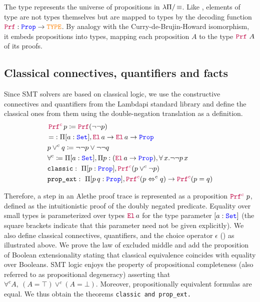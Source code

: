 The type \prop{} represents the universe of propositions in $\lambda\Pi/\mathop{\equiv}$. Like \set{}, elements of type \prop{} are not types themselves but are mapped to types by the decoding function $\textcolor{purple}{\texttt{\upshape{Prf}}}{}: \textcolor{blue}{\texttt{\upshape{Prop}}} \rightarrow \textcolor{orange}{\texttt{\upshape{TYPE}}}$. By analogy with the Curry-de-Brujin-Howard isomorphism, it embeds propositions into types, mapping each proposition $A$ to the type $\textcolor{purple}{\texttt{\upshape{Prf}}}{}~A$ of its proofs.

\subsection{Classical connectives, quantifiers and facts}

Since SMT solvers are based on classical logic, we use the constructive connectives and quantifiers from the Lambdapi standard library and define the classical ones from them using the double-negation translation \cite{dowek:classical} as a definition.
%
\begin{align*}
& \mathop{\textcolor{purple}{\texttt{\upshape{Prf}}^c}} p \coloneqq \mathop{\textcolor{purple}{\texttt{\upshape{Prf}}}{}} (\neg \neg p) \\
& \mathop{=}:  \Pi {[a: \textcolor{blue}{\texttt{\upshape{Set}}}]}, \textcolor{purple}{\texttt{\upshape{El}}}\, a \rightarrow \textcolor{purple}{\texttt{\upshape{El}}}\,a \rightarrow \textcolor{blue}{\texttt{\upshape{Prop}}} \\
& p \lor^c q \coloneqq  \neg \neg p \lor \neg \neg q \\
& \forall^c \coloneqq \Pi {[a: \textcolor{blue}{\texttt{\upshape{Set}}}]},  \Pi p: (\textcolor{purple}{\texttt{\upshape{El}}}\, a \rightarrow \textcolor{blue}{\texttt{\upshape{Prop}}}),  \forall \, x. \neg \neg  p\,x \\
&\texttt{classic}:\  \Pi [p: \textcolor{blue}{\texttt{\upshape{Prop}}}], \textcolor{purple}{\texttt{\upshape{Prf}}^c} (p \lor^c \neg p) \\
&\texttt{prop\_ext}:\  \Pi [p\,q: \textcolor{blue}{\texttt{\upshape{Prop}}}], \textcolor{purple}{\texttt{\upshape{Prf}}^c} (p \Leftrightarrow^c q ) \rightarrow \textcolor{purple}{\texttt{\upshape{Prf}}^c} (p = q) \\
\end{align*}

Therefore, a step in an Alethe proof trace is represented as a proposition $\textcolor{purple}{\texttt{\upshape{Prf}}^c}~p$, defined as the intuitionistic proof \prf{} of the doubly negated predicate.
Equality over small types is parameterized over types
$\textcolor{purple}{\texttt{\upshape{El}}}\,a$ for the type parameter $[a : \textcolor{blue}{\texttt{\upshape{Set}}}{}]$ (the square brackets indicate that this parameter need not be given explicitly).
We also define classical connectives, quantifiers, and the choice operator $\epsilon$ (\cite[\S 2.1]{alethespec}) as illustrated above.
We prove the law of excluded middle and add the proposition of Boolean extensionality stating that classical equivalence coincides with equality over Booleans.
SMT logic enjoys the property of propositional completeness (also referred to as propositional degeneracy) asserting that $\forall^c A,~(A = \top) \lor^c (A = \bot)$. Moreover, propositionally equivalent formulas are equal. We thus obtain the theorems
\tt{classic} and \tt{prop\_ext}.
\begin{align*}
\end{align*}

